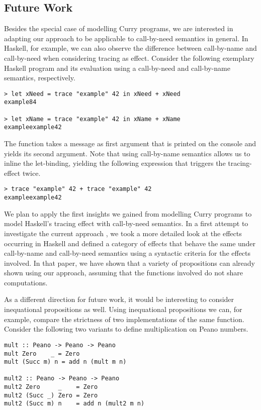 \subsection{Future Work}
Besides the special case of modelling Curry programs, we are
interested in adapting our approach to be applicable to call-by-need
semantics in general.
In Haskell, for example, we can also observe the difference
between call-by-name and call-by-need when considering tracing as
effect.
Consider the following exemplary Haskell program and its evaluation using
a call-by-need and call-by-name semantics, respectively.

\begin{verbatim}
> let xNeed = trace "example" 42 in xNeed + xNeed
example84

> let xName = trace "example" 42 in xName + xName
exampleexample42
\end{verbatim}

The function  takes a message as first
argument that is printed on the console and yields its second
argument.
Note that using call-by-name semantics allows us to inline the
let-binding, yielding the following expression that triggers the
tracing-effect twice.

\begin{verbatim}
> trace "example" 42 + trace "example" 42
exampleexample42
\end{verbatim}

We plan to apply the first insights we gained from modelling Curry
programs to model Haskell's tracing effect with call-by-need
semantics.
In a first attempt to investigate the current approach , we took a more
detailed look at the effects occurring in Haskell and defined a
category of effects that behave the same under call-by-name and
call-by-need semantics using a syntactic criteria for the effects
involved.
In that paper, we have shown that a variety of propositions can
already shown using our approach, assuming that the functions involved
do not share computations.

As a different direction for future work, it would be interesting to
consider inequational propositions as well.
Using inequational propositions we can, for example, compare the
strictness of two implementations of the same function.
Consider the following two variants to define multiplication on Peano
numbers.

\begin{verbatim}
mult :: Peano -> Peano -> Peano
mult Zero    _ = Zero
mult (Succ m) n = add n (mult m n)

mult2 :: Peano -> Peano -> Peano
mult2 Zero     _    = Zero
mult2 (Succ _) Zero = Zero
mult2 (Succ m) n    = add n (mult2 m n)
\end{verbatim}

